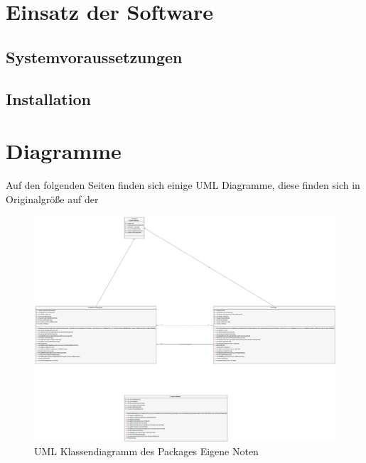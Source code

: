 \documentclass[12pt,a4paper,parskip]{scrreprt}
\begin{document}
\chapter{Einsatz der Software}
\section{Systemvoraussetzungen}
\section{Installation}
\chapter{Diagramme}
Auf den folgenden Seiten finden sich einige UML Diagramme, diese finden sich in Originalgröße auf der 
\begin{figure}[h]
	\centering
	\includegraphics[width=1\linewidth]{Diagramme/generated/package_eigene_noten_autosortiert}
	\caption[Package Eigene Noten]{UML Klassendiagramm des Packages \glqq Eigene Noten\grqq}
	\label{fig:package_eigene_noten}
\end{figure}
\end{document}
